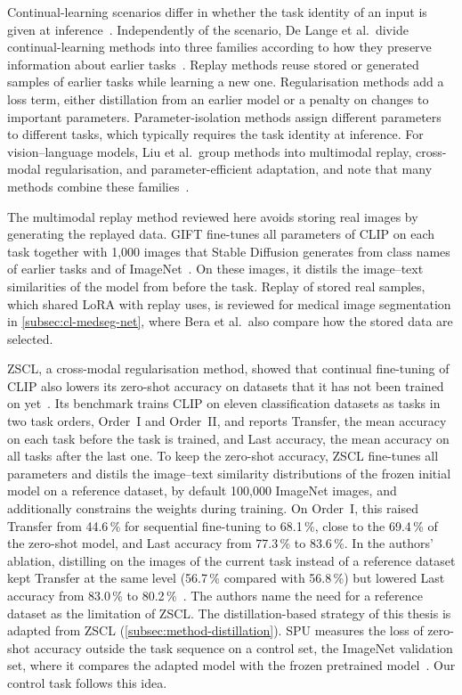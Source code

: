 Continual-learning scenarios differ in whether the task identity of an input is given at inference~\cite{van_de_Ven_2025}.
Independently of the scenario, De Lange et al.\ divide continual-learning methods into three families according to how they preserve information about earlier tasks~\cite[Sec.~3]{delange2022}.
Replay methods reuse stored or generated samples of earlier tasks while learning a new one.
Regularisation methods add a loss term, either distillation from an earlier model or a penalty on changes to important parameters.
Parameter-isolation methods assign different parameters to different tasks, which typically requires the task identity at inference.
For vision--language models, Liu et al.\ group methods into multimodal replay, cross-modal regularisation, and parameter-efficient adaptation, and note that many methods combine these families~\cite[Sec.~4]{liu2026continuallearningvlmssurvey}.

The multimodal replay method reviewed here avoids storing real images by generating the replayed data.
GIFT fine-tunes all parameters of CLIP on each task together with 1{,}000 images that Stable Diffusion generates from class names of earlier tasks and of ImageNet~\cite{wu2024gift}.
On these images, it distils the image--text similarities of the model from before the task.
Replay of stored real samples, which shared LoRA with replay uses, is reviewed for medical image segmentation in \cref{subsec:cl-medseg-net}, where Bera et al.\ also compare how the stored data are selected.

ZSCL, a cross-modal regularisation method, showed that continual fine-tuning of CLIP also lowers its zero-shot accuracy on datasets that it has not been trained on yet~\cite{zheng2023preventingzeroshottransferdegradation}.
Its benchmark trains CLIP on eleven classification datasets as tasks in two task orders, Order~I and Order~II, and reports Transfer, the mean accuracy on each task before the task is trained, and Last accuracy, the mean accuracy on all tasks after the last one.
To keep the zero-shot accuracy, ZSCL fine-tunes all parameters and distils the image--text similarity distributions of the frozen initial model on a reference dataset, by default 100{,}000 ImageNet images, and additionally constrains the weights during training.
On Order~I, this raised Transfer from 44.6\,\% for sequential fine-tuning to 68.1\,\%, close to the 69.4\,\% of the zero-shot model, and Last accuracy from 77.3\,\% to 83.6\,\%.
In the authors' ablation, distilling on the images of the current task instead of a reference dataset kept Transfer at the same level (56.7\,\% compared with 56.8\,\%) but lowered Last accuracy from 83.0\,\% to 80.2\,\%~\cite[Table~1b]{zheng2023preventingzeroshottransferdegradation}.
The authors name the need for a reference dataset as the limitation of ZSCL.
The distillation-based strategy of this thesis is adapted from ZSCL (\cref{subsec:method-distillation}).
SPU measures the loss of zero-shot accuracy outside the task sequence on a control set, the ImageNet validation set, where it compares the adapted model with the frozen pretrained model~\cite{Zhang_2024_CVPR}.
Our control task follows this idea.

